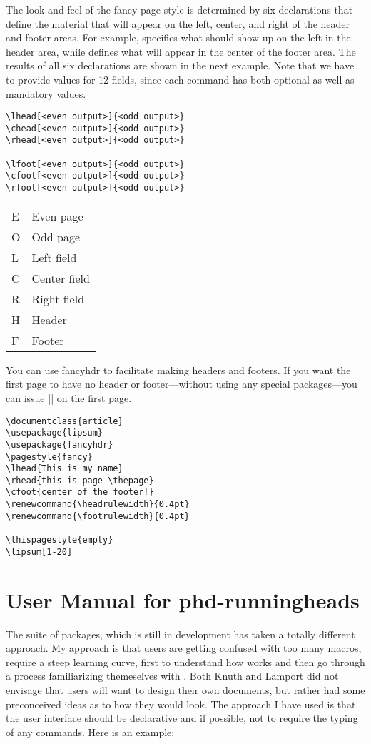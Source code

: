 The look and feel of the fancy page style is determined by six declarations that define the material that will appear on the left, center, and right of the header
and footer areas. For example,  specifies what should show up on the left
in the header area, while  defines what will appear in the center of the
footer area. The results of all six declarations are shown in the next example. Note that we have to provide values for 12 fields, since each command has both optional as well as mandatory values.

\begin{verbatim}
\lhead[<even output>]{<odd output>}
\chead[<even output>]{<odd output>}
\rhead[<even output>]{<odd output>}

\lfoot[<even output>]{<odd output>}
\cfoot[<even output>]{<odd output>}
\rfoot[<even output>]{<odd output>}
\end{verbatim}

\begin{tabular}{ll}
E  &Even page\\
O &Odd page\\
L  &Left field\\
C &Center field\\
R &Right field\\
H &Header\\
F  &Footer\\
\end{tabular}

You can use fancyhdr to facilitate making headers and footers. If you want the first page to have no header or footer---without using any special packages---you can issue |\thispagestyle{empty}| on the first page.


\begin{verbatim}
\documentclass{article}
\usepackage{lipsum}
\usepackage{fancyhdr}
\pagestyle{fancy}
\lhead{This is my name}
\rhead{this is page \thepage}
\cfoot{center of the footer!}
\renewcommand{\headrulewidth}{0.4pt}
\renewcommand{\footrulewidth}{0.4pt}

\thispagestyle{empty}
\lipsum[1-20]

\end{verbatim}

\chapter{User Manual for phd-runningheads}

The  suite of packages, which is still in development has taken a totally different approach. My approach is that users are getting confused with too many macros, require a steep learning curve, first to understand how \tex works and then go through a process familiarizing themeselves with \latexe. Both Knuth and Lamport did not envisage that users will want to design their own documents, but rather had some preconceived ideas as to how they would look. The approach I have used is that the user interface should be declarative and if possible, not to require the typing of any commands. Here is an example:

